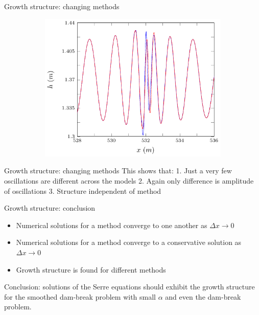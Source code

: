 \documentclass[pdf]{beamer}
\begin{document}
\begin{frame}{Growth structure: changing methods}
	\begin{figure}
		\begin{subfigure}{0.75\textwidth}
			\includegraphics[width=\textwidth]{../Pics/Models/all/4-figure0.pdf}
		\end{subfigure}
	\end{figure}
\end{frame}

\begin{frame}{Growth structure: changing methods}
	This shows that:
	\vskip 0.2cm
	1. Just a very few oscillations are different across the models
	\vskip 0.2cm
	2. Again only difference is amplitude of oscillations
	\vskip 0.2cm
	3. Structure independent of method
	
\end{frame}

\begin{frame}{Growth structure: conclusion}
\begin{itemize}
	\item Numerical solutions for a method converge to one another as $\Delta x \rightarrow 0$
	\item Numerical solutions for a method converge to a conservative solution as $\Delta x \rightarrow 0$
	\item Growth structure is found for different methods
\end{itemize}
	Conclusion: solutions of the Serre equations should exhibit the growth structure for the smoothed dam-break problem with small $\alpha$ and even the dam-break problem. 
\end{frame}
\end{document}
